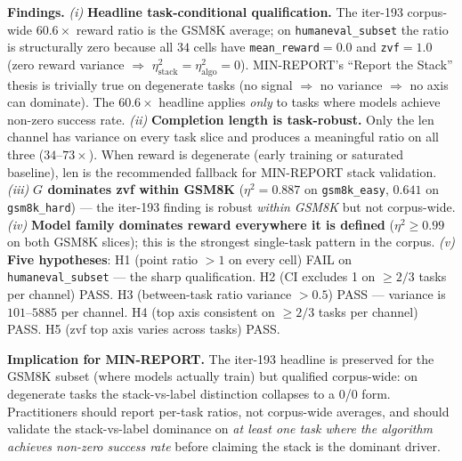 \textbf{Findings.}
\textit{(i)} \textbf{Headline task-conditional qualification.} The
iter-193 corpus-wide $60.6\times$ reward ratio is the GSM8K average;
on \texttt{humaneval\_subset} the ratio is structurally zero because
all $34$ cells have \texttt{mean\_reward}$=0.0$ and
\texttt{zvf}$=1.0$ (zero reward variance $\Rightarrow$
$\eta^2_{\text{stack}}=\eta^2_{\text{algo}}=0$). MIN-REPORT's
``Report the Stack'' thesis is trivially true on degenerate tasks
(no signal $\Rightarrow$ no variance $\Rightarrow$ no axis can
dominate). The $60.6\times$ headline applies \emph{only} to tasks
where models achieve non-zero success rate. \textit{(ii)}
\textbf{Completion length is task-robust.} Only the len channel has
variance on every task slice and produces a meaningful ratio on all
three ($34$--$73\times$). When reward is degenerate (early training
or saturated baseline), len is the recommended fallback for
MIN-REPORT stack validation. \textit{(iii)} \textbf{$G$ dominates
zvf within GSM8K} ($\eta^2=0.887$ on \texttt{gsm8k\_easy}, $0.641$
on \texttt{gsm8k\_hard}) --- the iter-193 finding is robust
\emph{within GSM8K} but not corpus-wide. \textit{(iv)}
\textbf{Model family dominates reward everywhere it is defined}
($\eta^2\ge 0.99$ on both GSM8K slices); this is the strongest
single-task pattern in the corpus. \textit{(v)} \textbf{Five
hypotheses}: H1 (point ratio $>1$ on every cell) FAIL on
\texttt{humaneval\_subset} --- the sharp qualification. H2 (CI
excludes 1 on $\ge 2/3$ tasks per channel) PASS. H3 (between-task
ratio variance $>0.5$) PASS --- variance is $101$--$5885$ per
channel. H4 (top axis consistent on $\ge 2/3$ tasks per channel)
PASS. H5 (zvf top axis varies across tasks) PASS.

\textbf{Implication for MIN-REPORT.} The iter-193 headline is
preserved for the GSM8K subset (where models actually train) but
qualified corpus-wide: on degenerate tasks the stack-vs-label
distinction collapses to a 0/0 form. Practitioners should report
per-task ratios, not corpus-wide averages, and should validate the
stack-vs-label dominance on \emph{at least one task where the
algorithm achieves non-zero success rate} before claiming the stack
is the dominant driver.